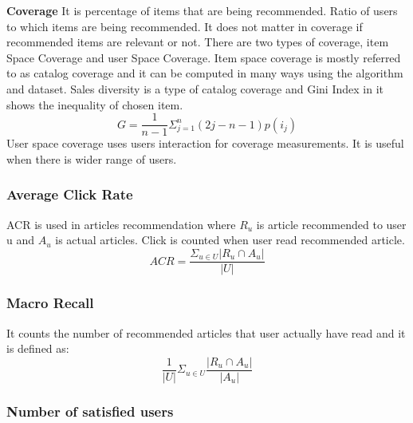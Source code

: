 \newline
\textbf{Coverage}
It is percentage of items that are being recommended. Ratio of users to which items are being recommended. It does not matter in coverage if recommended items are relevant or not\cite{N70}. There are two types of coverage, item Space Coverage and user Space Coverage\cite{Metrics5}. Item space coverage is mostly referred to as catalog coverage and it can be computed in many ways using the algorithm and dataset. Sales diversity is a type of catalog coverage and Gini Index in it shows the inequality of chosen item.
\[G = \frac{1}{n-1}\Sigma_{j=1}^n (2j-n-1)p(i_j)\]
User space coverage uses users interaction for coverage measurements. It is useful when there is wider range of users.
\newline
\subsubsection{Average Click Rate}
ACR is used in articles recommendation where $R_{u}$ is article recommended to user u and $A_{u}$ is actual articles\cite{p6-3}. Click is counted when user read recommended article.
\[ACR = \frac{\Sigma_{u\in U} |R_u \cap A_u|}{|U|}\]
\newline
\subsubsection{Macro Recall}
It counts the number of recommended articles that user actually have read\cite{p6-3} and it is defined as:
\[\frac{1}{|U|}\Sigma_{u\in U} \frac{|R_u \cap A_u|}{|A_u|}\]
\newline
\subsubsection{Number of satisfied users}

